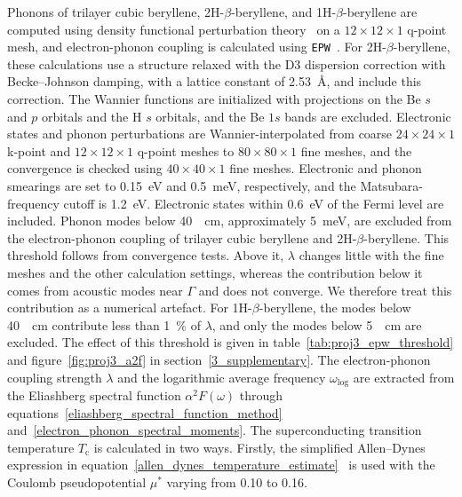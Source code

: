 Phonons of trilayer cubic beryllene,
2H-$\beta$-beryllene,
and 1H-$\beta$-beryllene are computed using density functional perturbation theory~\cite{baroni2001phonons} on a $12 \times 12 \times 1$ q-point mesh,
and electron-phonon coupling is calculated using \texttt{EPW}~\cite{lee2023electron,giustino2007electron}.
For 2H-$\beta$-beryllene,
these calculations use a structure relaxed with the D3 dispersion correction with Becke--Johnson damping,
with a lattice constant of \qty{2.53}{\angstrom},
and include this correction.
The Wannier functions are initialized with projections on the Be $s$ and $p$ orbitals and the H $s$ orbitals,
and the Be $1s$ bands are excluded.
Electronic states and phonon perturbations are Wannier-interpolated from coarse $24 \times 24 \times 1$ k-point and $12 \times 12 \times 1$ q-point meshes to $80 \times 80 \times 1$ fine meshes,
and the convergence is checked using $40 \times 40 \times 1$ fine meshes.
Electronic and phonon smearings are set to \qty{0.15}{\electronvolt} and \qty{0.5}{\milli\electronvolt}, respectively,
and the Matsubara-frequency cutoff is \qty{1.2}{\electronvolt}.
Electronic states within \qty{0.6}{\electronvolt} of the Fermi level are included.
Phonon modes below \qty{40}{\per\centi\metre}, approximately \qty{5}{\milli\electronvolt},
are excluded from the electron-phonon coupling of trilayer cubic beryllene and 2H-$\beta$-beryllene.
This threshold follows from convergence tests.
Above it, $\lambda$ changes little with the fine meshes and the other calculation settings,
whereas the contribution below it comes from acoustic modes near $\Gamma$ and does not converge.
We therefore treat this contribution as a numerical artefact.
For 1H-$\beta$-beryllene,
the modes below \qty{40}{\per\centi\metre} contribute less than \qty{1}{\percent} of $\lambda$,
and only the modes below \qty{5}{\per\centi\metre} are excluded.
The effect of this threshold is given in table~\ref{tab:proj3_epw_threshold} and figure~\ref{fig:proj3_a2f} in section~\ref{3_supplementary}.
The electron-phonon coupling strength $\lambda$ and the logarithmic average frequency $\omega_\mathrm{log}$ are extracted from the Eliashberg spectral function $\alpha^2F(\omega)$ through equations~\eqref{eliashberg_spectral_function_method} and~\eqref{electron_phonon_spectral_moments}.
The superconducting transition temperature $T_\mathrm{c}$ is calculated in two ways.
Firstly, the simplified Allen--Dynes expression in equation~\eqref{allen_dynes_temperature_estimate}~\cite{allen-dynes,mcmillan1968transition} is used with the Coulomb pseudopotential $\mu^*$ varying from 0.10 to 0.16.
